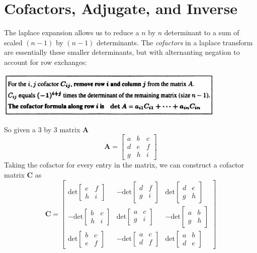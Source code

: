 \documentclass{report}
\begin{document}
\section{Cofactors, Adjugate, and Inverse}
The laplace expansion allows us to reduce a $n$ by $n$ determinant to a sum of scaled $(n-1)$ by $(n-1)$ determinants. The \textit{cofactors} in a laplace transform are 
essentially these smaller determinants, but with alternanting negation to account for
row exchanges:
\begin{center}
\includegraphics[width=11cm]{100}
\end{center}
So given a 3 by 3 matrix $\bm A$
\begin{equation*}
\bm A=
\left[\begin{array}{ccc}
a&b&c\\d&e&f\\g&h&i
\end{array}\right]
\end{equation*}
Taking the cofactor for every entry in the matrix, we can construct a cofactor matrix $\bm C$ as
\begin{equation*}
\bm C=
\left[\begin{array}{ccc}
\text{det}\left[\begin{array}{cc}e&f\\h&i\end{array}\right]&
-\text{det}\left[\begin{array}{cc}d&f\\g&i\end{array}\right]&
\text{det}\left[\begin{array}{cc}d&e\\g&h\end{array}\right]\\
-\text{det}\left[\begin{array}{cc}b&c\\h&i\end{array}\right]&
\text{det}\left[\begin{array}{cc}a&c\\g&i\end{array}\right]&
-\text{det}\left[\begin{array}{cc}a&b\\g&h\end{array}\right]\\
\text{det}\left[\begin{array}{cc}b&c\\e&f\end{array}\right]&
-\text{det}\left[\begin{array}{cc}a&c\\d&f\end{array}\right]&
\text{det}\left[\begin{array}{cc}a&b\\d&e\end{array}\right]
\end{array}\right]
\end{equation*}
\end{document}
